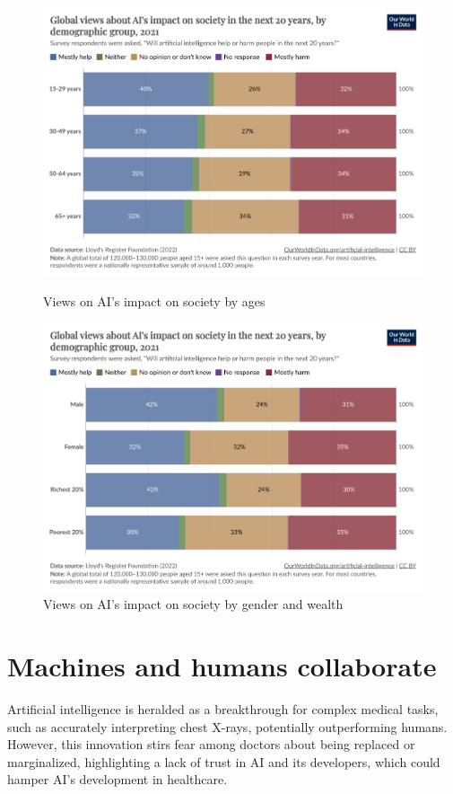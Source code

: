 \documentclass[paper=a4, fontsize=11pt]{scrartcl} %
\numberwithin{equation}{section} %
\numberwithin{figure}{section} %
\numberwithin{table}{section} %
\begin{document}
\begin{figure}[H]
    \centering
    \begin{minipage}[t]{0.48\linewidth}
        \includegraphics[width=\linewidth]{./data/influence_by_ages.png}
        \caption{Views on AI's impact on society by ages}
        \label{fig:investment}
    \end{minipage}\hfill
    \begin{minipage}[t]{0.48\linewidth}
        \includegraphics[width=\linewidth]{./data/influence_by_demographic_group.png}
        \caption{Views on AI's impact on society by gender and wealth}
        \label{fig:views_ai_impact}
    \end{minipage}
\end{figure}


\section{Machines and humans collaborate}
Artificial intelligence is heralded as a breakthrough for complex medical tasks, such as accurately interpreting chest X-rays, 
potentially outperforming humans. However, this innovation stirs fear among doctors about being replaced or marginalized, 
highlighting a lack of trust in AI and its developers, which could hamper AI's development in healthcare. 
\end{document}
